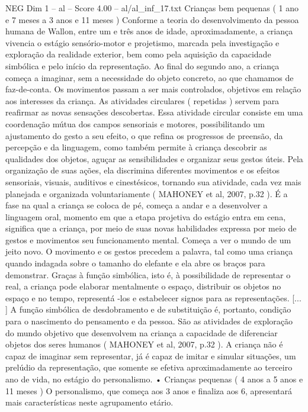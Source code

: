 \begin{textsample}{NEG Dim 1 – al – Score 4.00 – al/al\_inf\_17.txt}  \label{ex:f1_neg_135}
Crianças bem pequenas ( 1 ano e 7 meses a 3 anos e 11 meses ) Conforme a teoria do desenvolvimento da pessoa humana de Wallon, entre um e três anos de idade, aproximadamente, a criança vivencia o estágio sensório-motor e projetismo, marcada pela investigação e exploração da realidade exterior, bem como pela aquisição da capacidade simbólica e pelo início da representação.
Ao final do segundo ano, a criança começa a imaginar, sem a necessidade do objeto concreto, ao que chamamos de faz-de-conta.
Os movimentos passam a ser mais controlados, objetivos em relação aos interesses da criança.
As atividades circulares ( repetidas ) servem para reafirmar as novas sensações descobertas.
Essa atividade circular consiste em uma coordenação mútua dos campos sensoriais e motores, possibilitando um ajustamento do gesto a seu efeito, o que refina os progressos de preensão, da percepção e da linguagem, como também permite à criança descobrir as qualidades dos objetos, aguçar as sensibilidades e organizar seus gestos úteis.
Pela organização de suas ações, ela discrimina diferentes movimentos e os efeitos sensoriais, visuais, auditivos e cinestésicos, tornando sua atividade, cada vez mais planejada e organizada voluntariamente ( MAHONEY et al, 2007, p.32 ).
É a fase na qual a criança se coloca de pé, começa a andar e a desenvolver a linguagem oral, momento em que a etapa projetiva do estágio entra em cena, significa que a criança, por meio de suas novas habilidades expressa por meio de gestos e movimentos seu funcionamento mental.
Começa a ver o mundo de um jeito novo.
O movimento e os gestos precedem a palavra, tal como uma criança quando indagada sobre o tamanho do elefante e ela abre os braços para demonstrar.
Graças à função simbólica, isto é, à possibilidade de representar o real, a criança pode elaborar mentalmente o espaço, distribuir os objetos no espaço e no tempo, representá -los e estabelecer signos para as representações. [... ] A função simbólica de desdobramento e de substituição é, portanto, condição para o nascimento do pensamento e da pessoa.
São as atividades de exploração do mundo objetivo que desenvolvem na criança a capacidade de diferenciar objetos dos seres humanos ( MAHONEY et al, 2007, p.32 ).
A criança não é capaz de imaginar sem representar, já é capaz de imitar e simular situações, um prelúdio da representação, que somente se efetiva aproximadamente ao terceiro ano de vida, no estágio do personalismo. • Crianças pequenas ( 4 anos a 5 anos e 11 meses ) O personalismo, que começa aos 3 anos e finaliza aos 6, apresentará mais características neste agrupamento etário.

\end{textsample}
